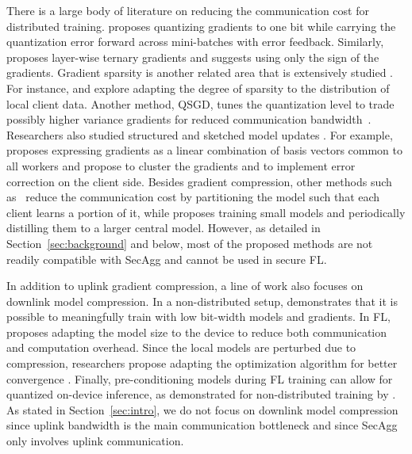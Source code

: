 \documentclass[11pt]{article}
\newcommand{\SecAgg}{{\sc SecAgg}\xspace}
\begin{document}
 There is a large body of literature on reducing the communication cost for distributed training. \cite{Graham-seide2014bit} proposes quantizing gradients to one bit while carrying the quantization error forward across mini-batches with error feedback. Similarly, \cite{Graham-wen2017terngrad} proposes layer-wise ternary gradients and \cite{Graham-bernstein2018signsgd} suggests using only the sign of the gradients. Gradient sparsity is another related area that is extensively studied \cite{Graham-wangni2017gradient,Graham-aji2017sparse,Graham-lin2017deep,Graham-renggli2018sparcml,Graham-parcollet2022zerofl}.
For instance, \cite{Graham-chen2017adacomp} and \cite{Graham-han2020adaptive} explore adapting the degree of sparsity to the distribution of local client data. Another method, QSGD, tunes the quantization level to trade possibly higher variance gradients for reduced communication bandwidth~\cite{Graham-alistarh2016qsgd}. Researchers also studied structured and sketched model updates \cite{Graham-konen2016federated}.
For example, \cite{Graham-wang2018atomo} proposes expressing gradients as a linear combination of basis vectors common to all workers and \cite{Graham-wang2022fedlite} propose to cluster the gradients and to implement error correction on the client side. Besides gradient compression, other methods such as~\cite{Graham-vepakomma2018split,Graham-hu2019dynamic} reduce the communication cost by partitioning the model such that each client learns a portion of it, while \cite{Graham-he2020group} proposes training small models and periodically distilling them to a larger central model. However, as detailed in Section~\ref{sec:background} and below, most of the proposed methods are not readily compatible with \SecAgg and cannot be used in secure FL.

 In addition to uplink gradient compression, a line of work also focuses on downlink model compression. In a non-distributed setup, \cite{Graham-zhou2016dorefanet, Graham-courbariaux2015binaryconnect} demonstrates that it is possible to meaningfully train with low bit-width models and gradients. In FL, \cite{Graham-jiang2019model} proposes adapting the model size to the device to reduce both communication and computation overhead. Since the local models are perturbed due to compression, researchers propose adapting the optimization algorithm for better convergence \cite{Graham-liu2019double,Graham-sattler2019robust,Graham-tang2019doublesqueeze,Graham-zheng2019communicationefficient,Graham-amiri2020federated,Graham-philippenko2021preserved}.
Finally, pre-conditioning models during FL training can allow for quantized on-device inference, as demonstrated for non-distributed training by \cite{Graham-gupta2015deep, Graham-krishnamoorthi2018quantizing}. As stated in Section~\ref{sec:intro}, we do not focus on downlink model compression since uplink bandwidth is the main communication bottleneck and since \SecAgg only involves uplink communication.
\end{document}
